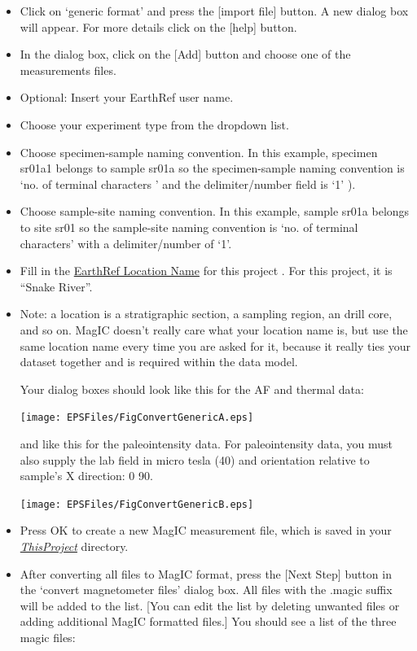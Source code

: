 \documentclass[11pt]{book}
\begin{document}
{\begin{itemize}
\item  Click on  `generic format'  and press the  [import file] button.  A new dialog box will appear. For more details click on the [help] button.
\item  In the dialog box, click on the [Add] button and choose one of the measurements files.
\item  Optional: Insert your EarthRef user name.
\item Choose your experiment type from the dropdown list.

\item Choose specimen-sample naming convention.  In this example, specimen sr01a1 belongs to sample sr01a so the specimen-sample naming convention is  `no. of terminal characters ' and the delimiter/number field is `1' ).
\item Choose sample-site naming convention.  In this example, sample sr01a belongs to site sr01 so the sample-site naming convention is  `no. of terminal characters' with a delimiter/number of  `1'.
\item  Fill in the \href{#MagICDatabase}{EarthRef Location Name}  for this project .  For this project, it is ``Snake River''.

\item Note:  a location is a stratigraphic section,  a sampling region,  an drill core, and so on.  MagIC doesn't really care what your location name is, but use the same location name every time you are asked for it, because it really ties your dataset together and is required within the data model.

Your dialog boxes should look like this for the AF and thermal data:

\texttt{[image: EPSFiles/FigConvertGenericA.eps]}

and like this for the  paleointensity data.  For paleointensity data, you must also supply the lab field in micro tesla (40) and orientation relative to sample's X direction:  0 90.

\texttt{[image: EPSFiles/FigConvertGenericB.eps]}

\item Press OK to create a new MagIC measurement file, which is saved in your \href{#Project_Directory}{\it ThisProject} directory.



\item After converting all files to MagIC format, press the [Next Step] button in the `convert magnetometer files' dialog box. All files with the .magic suffix will be added to the list.  [You can edit the list by deleting unwanted files or adding additional MagIC formatted files.]   You should see a list of the three magic files:


\end{itemize}}
\end{document}
